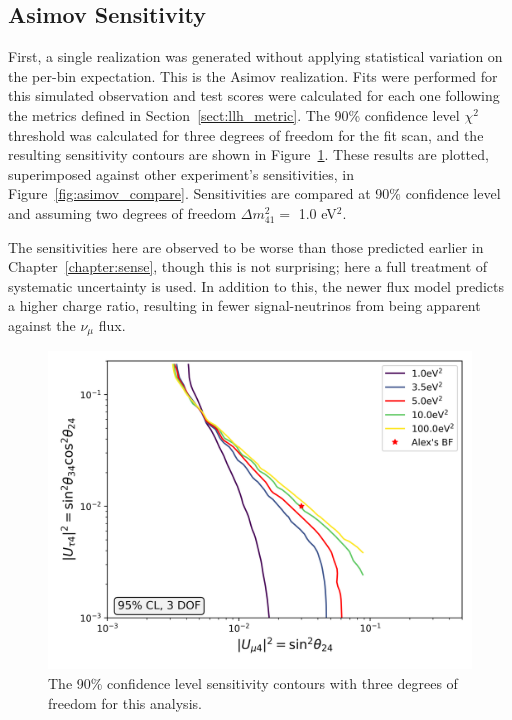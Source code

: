 \documentclass[main.tex]{subfiles}
\begin{document}
\subsection{Asimov Sensitivity}

First, a single realization was generated without applying statistical variation on the per-bin expectation. 
This is the Asimov realization. 
Fits were performed for this simulated observation and test scores were calculated for each one following the metrics defined in Section~\ref{sect:llh_metric}.
The 90\% confidence level $\chi^{2}$ threshold was calculated for three degrees of freedom for the fit scan, and the resulting sensitivity contours are shown in Figure~\ref{fig:asimov_sense}. 
These results are plotted, superimposed against other experiment's sensitivities, in Figure~\ref{fig:asimov_compare}. 
Sensitivities are compared at 90\% confidence level and assuming two degrees of freedom $\Delta m_{41}^{2}=$ 1.0 eV$^{2}$.

The sensitivities here are observed to be worse than those predicted earlier in Chapter~\ref{chapter:sense}, though this is not surprising; here a full treatment of systematic uncertainty is used.
In addition to this, the newer flux model predicts a higher charge ratio, resulting in fewer signal-neutrinos from being apparent against the $\nu_{\mu}$ flux.

\begin{figure}
    \centering
    \includegraphics[width=0.7\linewidth]{figures/joint_asimov_oldairs_Realization_Asimov_sterile_0_cl0.95_dof3}
    \caption{The 90\% confidence level sensitivity contours with three degrees of freedom for this analysis.}\label{fig:asimov_sense}
\end{figure}
\end{document}
